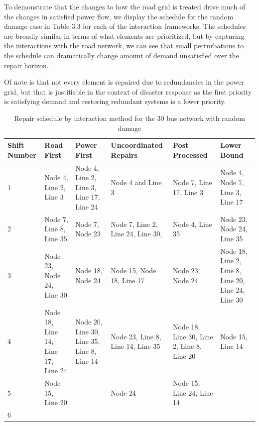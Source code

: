 To demonstrate that the changes to how the road grid is treated drive much of the changes in satisfied power flow, we display the schedule for the random damage case in Table 3.3 for each of the interaction frameworks. The schedules are broadly similar in terms of what elements are prioritized, but by capturing the interactions with the road network, we can see that small perturbations to the schedule can dramatically change amount of demand unsatisfied over the repair horizon.

Of note is that not every element is repaired due to redundancies in the power grid, but that is justifiable in the context of disaster response as the first priority is satisfying demand and restoring redundant systems is a lower priority.  

\begin{table}[htbp]
	\centering
\caption{Repair schedule by interaction method for the 30 bus network with random damage}
	\begin{tabular}{|p{1.45cm}|p{2.1cm}|p{2.25cm}|p{2.5cm}|p{1.75cm}|p{1.75cm}|}
				
			\hline
			Shift Number & Road First & Power First & Uncoordinated Repairs  &Post Processed & Lower Bound \\\hline
			1 & Node 4, Line 2, Line 3 &Node 4, Line 2, Line 3, Line 17, Line 24& Node 4 and Line 3 & Node 7, Line 17, Line 3 & Node 4, Node 7, Line 3, Line 17 \\\hline
			2 & Node 7, Line 8, Line 35 & Node 7, Node 23& Node 7, Line 2, Line 24, Line 30,  & Node 4, Line 35&  Node 23, Node 24, Line 35\\\hline
			3 & Node 23, Node 24, Line 30 & Node 18, Node 24 & Node 15, Node 18, Line 17&  Node 23, Node 24 & Node 18, Line 2, Line 8, Line 20, Line 24, Line 30 \\\hline
			4 & Node 18, Line 14, Line 17, Line 24 & Node 20, Line 30, Line 35, Line 8, Line 14& Node 23, Line 8, Line 14, Line 35 & Node 18, Line 30, Line 2, Line 8, Line 20 & Node 15, Line 14\\\hline
			5 & Node 15, Line 20 & & Node 24 & Node 15, Line 24, Line 14&\\\hline
			6 & & & && \\\hline
	\end{tabular}
	
	\label{time}
\end{table}
